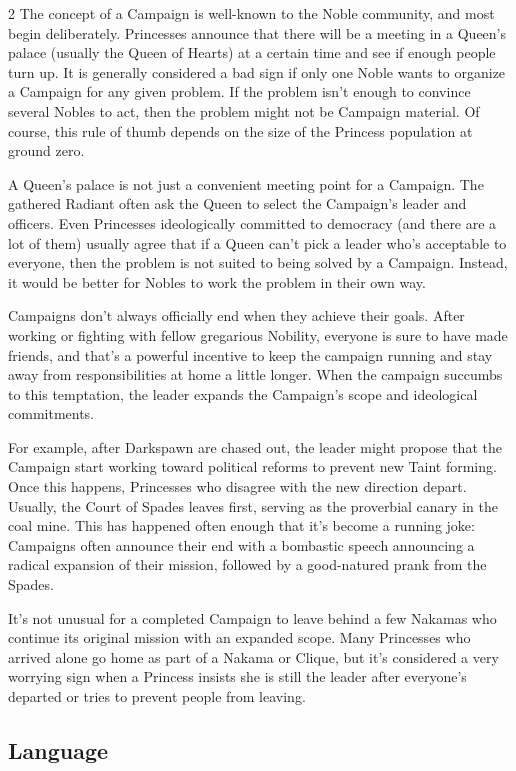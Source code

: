 \begin{multicols}{2}
The concept of a Campaign is well-known to the Noble community, and most begin deliberately. Princesses announce that there will be a meeting in a Queen's palace (usually the Queen of Hearts) at a certain time and see if enough people turn up. It is generally considered a bad sign if only one Noble wants to organize a Campaign for any given problem. If the problem isn't enough to convince several Nobles to act, then the problem might not be Campaign material. Of course, this rule of thumb depends on the size of the Princess population at ground zero. 

A Queen's palace is not just a convenient meeting point for a Campaign. The gathered Radiant often ask the Queen to select the Campaign's leader and officers. Even Princesses ideologically committed to democracy (and there are a lot of them) usually agree that if a Queen can't pick a leader who's acceptable to everyone, then the problem is not suited to being solved by a Campaign. Instead, it would be better for Nobles to work the problem in their own way.

Campaigns don't always officially end when they achieve their goals. After working or fighting with fellow gregarious Nobility, everyone is sure to have made friends, and that's a powerful incentive to keep the campaign running and stay away from responsibilities at home a little longer. When the campaign succumbs to this temptation, the leader expands the Campaign's scope and ideological commitments. 

For example, after Darkspawn are chased out, the leader might propose that the Campaign start working toward political reforms to prevent new Taint forming. Once this happens, Princesses who disagree with the new direction depart. Usually, the Court of Spades leaves first, serving as the proverbial canary in the coal mine. This has happened often enough that it's become a running joke: Campaigns often announce their end with a bombastic speech announcing a radical expansion of their mission, followed by a good-natured prank from the Spades. 

It's not unusual for a completed Campaign to leave behind a few Nakamas who continue its original mission with an expanded scope. Many Princesses who arrived alone go home as part of a Nakama or Clique, but it's considered a very worrying sign when a Princess insists she is still the leader after everyone's departed or tries to prevent people from leaving.

\subsection*{Language}


\end{multicols}
